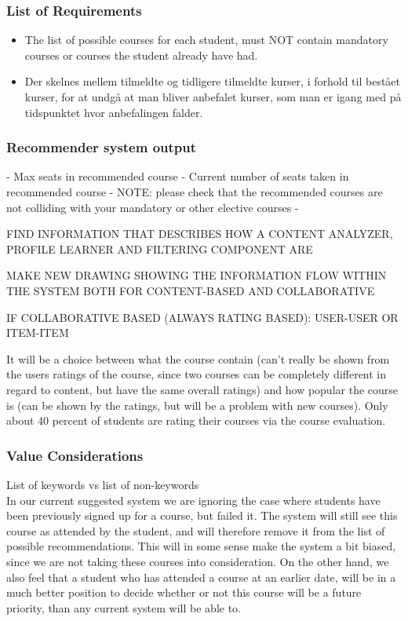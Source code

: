 \subsubsection{List of Requirements}
\begin{itemize}
	\item The list of possible courses for each student, must NOT contain mandatory courses or courses the student already have had.
	\item Der skelnes mellem tilmeldte og tidligere tilmeldte kurser, i forhold til bestået kurser, for at undgå at man bliver anbefalet kurser, som man er igang med på tidspunktet hvor anbefalingen falder. 
\end{itemize}
  

\subsubsection{Recommender system output}

- Max seats in recommended course
- Current number of seats taken in recommended course
- NOTE: please check that the recommended courses are not colliding with your mandatory or other elective courses
- 




FIND INFORMATION THAT DESCRIBES HOW A CONTENT ANALYZER, PROFILE LEARNER AND FILTERING COMPONENT ARE 

MAKE NEW DRAWING SHOWING THE INFORMATION FLOW WITHIN THE SYSTEM BOTH FOR CONTENT-BASED AND COLLABORATIVE



IF COLLABORATIVE BASED (ALWAYS RATING BASED): USER-USER OR ITEM-ITEM

It will be a choice between what the course contain (can't really be shown from the users ratings of the course, since two courses can be completely different in regard to content, but have the same overall ratings) and how popular the course is (can be shown by the ratings, but will be a problem with new courses). Only about 40 percent of students are rating their courses via the course evaluation.

\subsubsection{Value Considerations} %
\label{sub:value_considerations}
List of keywords vs list of non-keywords\\
In our current suggested system we are ignoring the case where students have been previously signed up for a course, but failed it. The system will still see this course as attended by the student, and will therefore remove it from the list of possible recommendations. This will in some sense make the system a bit biased, since we are not taking these courses into consideration. On the other hand, we also feel that a student who has attended a course at an earlier date, will be in a much better position to decide whether or not this course will be a future priority, than any current system will be able to.

